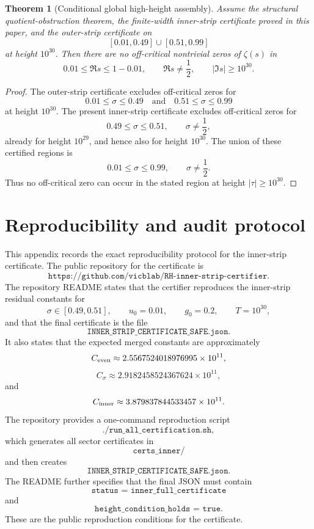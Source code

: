 \documentclass[11pt]{article}
\newtheorem{theorem}{Theorem}[section]
\newcommand{\sig}{\sigma}
\newcommand{\tauh}{\tau}
\newcommand{\JSON}[1]{\texttt{#1}}
\newcommand{\code}[1]{\texttt{#1}}
\begin{document}
\begin{theorem}[Conditional global high-height assembly]
Assume the structural quotient-obstruction theorem, the finite-width
inner-strip certificate proved in this paper, and the outer-strip certificate \cite{OuterRepo}
on
\[
        [0.01,0.49]\cup[0.51,0.99]
\]
at height \(10^{30}\).  Then there are no off-critical nontrivial zeros of
\(\zeta(s)\) in
\[
        0.01\le\Re s\le1-0.01,
        \qquad
        \Re s\ne\frac12,
        \qquad
        |\Im s|\ge10^{30}.
\]
\end{theorem}

\begin{proof}
The outer-strip certificate excludes off-critical zeros for
\[
        0.01\le\sig\le0.49
        \quad\text{and}\quad
        0.51\le\sig\le0.99
\]
at height \(10^{30}\).  The present inner-strip certificate excludes
off-critical zeros for
\[
        0.49\le\sig\le0.51,
        \qquad
        \sig\ne\frac12,
\]
already for height \(10^{29}\), and hence also for height \(10^{30}\).
The union of these certified regions is
\[
        0.01\le\sig\le0.99,
        \qquad
        \sig\ne\frac12.
\]
Thus no off-critical zero can occur in the stated region at height
\(|\tauh|\ge10^{30}\).
\end{proof}



\appendix

\section{Reproducibility and audit protocol}

This appendix records the exact reproducibility protocol for the inner-strip
certificate.  The public repository for the certificate is
\[
        \texttt{https://github.com/vicblab/RH-inner-strip-certifier}.
\]
The repository README states that the certifier reproduces the inner-strip
residual constants for
\[
        \sig\in[0.49,0.51],
        \qquad
        u_0=0.01,
        \qquad
        g_0=0.2,
        \qquad
        T=10^{30},
\]
and that the final certificate is the file
\[
        \code{INNER\_STRIP\_CERTIFICATE\_SAFE.json}.
\]
It also states that the expected merged constants are approximately
\[
        C_{\rm even}\approx2.5567524018976995\times10^{11},
\]
\[
        C_{\sig}\approx2.9182458524367624\times10^{11},
\]
and
\[
        C_{\rm inner}\approx3.879837844533457\times10^{11}.
\]
The repository provides a one-command reproduction script
\[
        \code{./run\_all\_certification.sh},
\]
which generates all sector certificates in
\[
        \code{certs\_inner/}
\]
and then creates
\[
        \code{INNER\_STRIP\_CERTIFICATE\_SAFE.json}.
\]
The README further specifies that the final JSON must contain
\[
        \JSON{status = inner\_full\_certificate}
\]
and
\[
        \JSON{height\_condition\_holds = true}.
\]
These are the public reproduction conditions for the certificate. \cite{InnerRepo}
\end{document}
